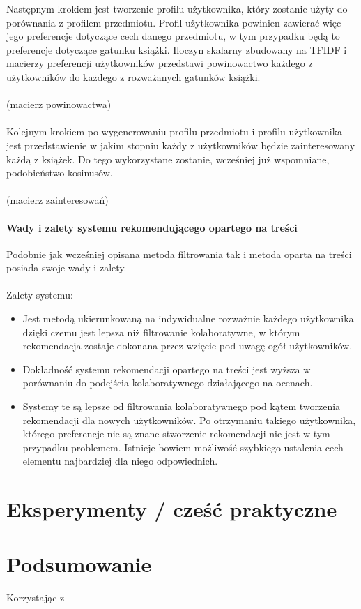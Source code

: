 \documentclass[12pt,a4paper]{report}
\begin{document}
Następnym krokiem jest tworzenie profilu użytkownika, który zostanie użyty do porównania z profilem przedmiotu. Profil użytkownika powinien zawierać więc jego preferencje dotyczące cech danego przedmiotu, w tym przypadku będą to preferencje dotyczące gatunku książki. Iloczyn skalarny zbudowany na TFIDF i macierzy preferencji użytkowników przedstawi powinowactwo każdego z użytkowników do każdego z rozważanych gatunków książki. 
\\
\\(macierz powinowactwa)
\\
\\Kolejnym krokiem po wygenerowaniu profilu przedmiotu i profilu użytkownika jest przedstawienie w jakim stopniu każdy z użytkowników będzie zainteresowany każdą z książek. Do tego wykorzystane zostanie, wcześniej już wspomniane, podobieństwo kosinusów.
\\
\\(macierz zainteresowań)
\\

\subsubsection{Wady i zalety systemu rekomendującego opartego na treści}
Podobnie jak wcześniej opisana metoda filtrowania tak i metoda oparta na treści posiada swoje wady i zalety.
\\
\\Zalety systemu: 
\begin{itemize}
\item Jest metodą ukierunkowaną na indywidualne rozważnie każdego użytkownika dzięki czemu jest lepsza niż filtrowanie kolaboratywne, w którym rekomendacja zostaje dokonana przez wzięcie pod uwagę ogół użytkowników.
\item Dokładność systemu rekomendacji opartego na treści jest wyższa w porównaniu do podejścia kolaboratywnego działającego na ocenach.
\item Systemy te są lepsze od filtrowania kolaboratywnego pod kątem tworzenia rekomendacji dla nowych użytkowników. Po otrzymaniu takiego użytkownika, którego preferencje nie są znane stworzenie rekomendacji nie jest w tym przypadku problemem. Istnieje bowiem możliwość szybkiego ustalenia cech elementu najbardziej dla niego odpowiednich. 
\end{itemize}



\chapter{Eksperymenty / cześć praktyczne}

\chapter{Podsumowanie}

Korzystając z \citep[Rozdział 3, akapit 4]{ricci2015recommender}

\nocite{*} %


\end{document}
